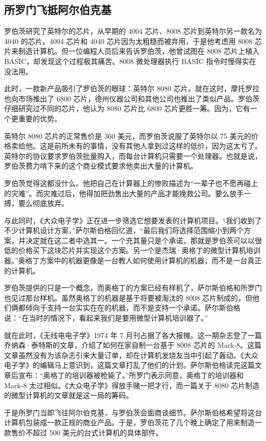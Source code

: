 \documentclass[12pt,UTF8]{ctexbook}
\begin{document}
\subsection{所罗门飞抵阿尔伯克基}


罗伯茨研究了英特尔的芯片，从早期的 4004 芯片、8008 芯片到英特尔另一款名为 4040 的芯片。4004 芯片和 4040 芯片因为太粗糙而被弃用，于是他考虑用 8008 芯片来制造计算机。但一位编程人员后来告诉罗伯茨，他曾试图在 8008 芯片上植入 BASIC，却发现这个过程极其痛苦。8008 微处理器执行 BASIC 指令时慢得实在没法用。

此时，一款新产品吸引了罗伯茨的眼球：英特尔 8080 芯片。就在这时，摩托罗拉也向市场推出了 6800 芯片，德州仪器公司和其他公司也推出了类似产品。罗伯茨仔细研究过不同的芯片，他认为 8080 芯片比 6800 芯片更胜一筹。因为，它有一个更重要的优势。

英特尔 8080 芯片的正常售价是 360 美元，而罗伯茨说服了英特尔以 75 美元的价格卖给他。这是前所未有的事情，没有其他人拿到过这样的低价，因为这太亏了。英特尔的协议要求罗伯茨批量购入，而每台计算机只需要一个处理器。也就是说，罗伯茨费力啃下来的这个商业模式要求他卖出大量的计算机。

罗伯茨觉得这都没什么。他把自己在计算器上的惨败描述为“一辈子也不愿再碰上的灾难”。而灾难过后，他得加把劲售出大量的产品才能挽救公司。要么放手一搏，要么彻底放弃。

与此同时，《大众电子学》正在进一步筛选它想要发表的计算机项目。“我们收到了不少计算机设计方案，”萨尔斯伯格回忆道，“最后我们将选择范围缩小到两个方案，并决定就在这二者中选其一。一个充其量只是个承诺，那就是罗伯茨可以以很低的价格买下这块芯片并实现这个方案。另一个是杰瑞·奥格丁的微型计算机培训器。”奥格丁方案中的机器更像是一台教人如何使用计算机的机器，而不是一台真正的计算机。

罗伯茨提供的只是一个概念，而奥格丁的方案已经有样机了，萨尔斯伯格和所罗门也见过那台样机。虽然奥格丁的机器是基于将要被淘汰的 8008 芯片制成的，但他们俩都倾向于支持一台实实在在的机器，而不是支持一个承诺。萨尔斯伯格说：“在当时的情况下，看起来我们是要用微型计算机培训器了。”

就在此时，《无线电电子学》1974 年 7 月刊占据了各大报摊。这一期杂志登了一篇乔纳森·泰特斯的文章，介绍了如何在家自制一台基于 8008 芯片的 Mark-8。这篇文章虽然没有为该杂志引来大量订单，却在计算机发烧友当中引起了轰动。《大众电子学》的编辑马上意识到，这篇文章打乱了他们的计划。萨尔斯伯格读完这篇文章后宣布：“奥格丁的培训器被枪毙了。”所罗门表示同意，奥格丁的培训器和 Mark-8 太过相似。《大众电子学》得放手赌一把才行，而一篇关于 8080 芯片制造的微型计算机的文章就是这一局的筹码。

于是所罗门当即飞往阿尔伯克基，与罗伯茨会面商谈细节。萨尔斯伯格希望将这台计算机包装成一款正规的商业产品。于是，罗伯茨花了几个晚上确定了用来制造一款售价不超过 500 美元的台式计算机的具体部件。
\end{document}
